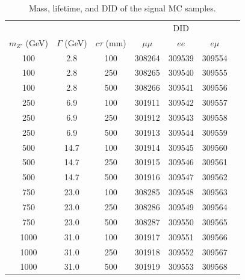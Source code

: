 \begin{table}[!htb]
  \centering
  \begin{tabular}{ c c c c c c c }
    \hline
    \hline
           &   &    & \multicolumn{3}{c}{DID}                 \\
    $m_{Z'}$ (GeV) & $\Gamma$ (GeV) & $c\tau$ (mm) &$\mu\mu$ & $ee$ & $e\mu$ \\
    \hline
    100			   &	2.8         &   100	& 308264	& 309539		&	309554		\\
    100			   &	2.8         &   250	& 308265	& 309540		&	309555		\\
    100			   &	2.8         &   500	& 308266	& 309541		&	309556		\\
    250			   &   6.9	        &   100	& 301911	& 309542		&	309557		\\
    250			   &	6.9         &   250	& 301912	& 309543		&	309558		\\
    250			   &	6.9         &   500	& 301913	& 309544		&	309559		\\
    500			   &   14.7         &   100	& 301914	& 309545		&	309560		\\
    500			   &	14.7        &   250	& 301915	& 309546		&	309561		\\
    500			   &	14.7        &   500	& 301916	& 309547		&	309562		\\
    750			   &	23.0        &   100	& 308285	& 309548		&	309563		\\
    750			   &	23.0        &   250	& 308286	& 309549		&	309564		\\
    750			   &	23.0        &   500	& 308287	& 309550		&	309565		\\
    1000	       &	31.0        &   100	& 301917	& 309551		&	309566		\\
    1000	       &	31.0        &   250	& 301918	& 309552		&	309567		\\
    1000	       &	31.0        &   500	& 301919	& 309553		&	309568		\\
    \hline
    \hline
  \end{tabular}
  \caption{Mass, lifetime, and DID of the signal MC samples.}
  \label{table:MC_signal_samples}
\end{table}
